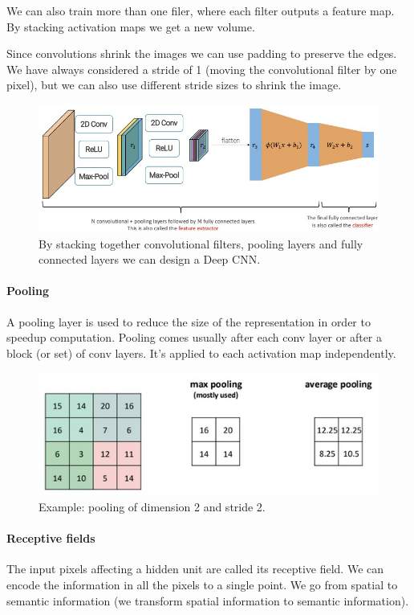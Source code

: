 We can also train more than one filer, where each filter outputs a feature map.
By stacking activation maps we get a new volume.

Since convolutions shrink the images we can use padding to preserve the edges.
We have always considered a stride of 1 (moving the convolutional filter by one pixel), but we can also use different stride sizes to shrink the image.

\begin{figure}[htbp]
  \centering
  \includegraphics[width=0.8\linewidth]{./img/deep_cnn.jpg}
  \caption{By stacking together convolutional filters, pooling layers and fully connected layers we can design a Deep CNN.}
\end{figure}

\paragraph{Pooling}
A pooling layer is used to reduce the size of the representation in order to speedup computation.
Pooling comes usually after each conv layer or after a block (or set) of conv layers.
It's applied to each activation map independently.

\begin{figure}[htbp]
  \centering
  \includegraphics[width=0.8\linewidth]{./img/pooling.jpg}
  \caption{Example: pooling of dimension 2 and stride 2.}
\end{figure}

\paragraph{Receptive fields}
The input pixels affecting a hidden unit are called its receptive field.
We can encode the information in all the pixels to a single point.
We go from spatial to semantic information (we transform spatial information to semantic information).


